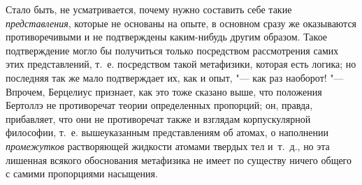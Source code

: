 Стало быть, не усматривается, почему нужно составить себе такие
{\em представления}, которые не основаны на опыте, в основном сразу же
оказываются противоречивыми и не подтверждены каким-нибудь другим образом.
Такое подтверждение могло бы получиться только посредством рассмотрения самих
этих представлений, т.~е. посредством такой метафизики, которая есть логика; но
последняя так же мало подтверждает их, как и опыт, "--- как раз наоборот! "---
Впрочем, Берцелиус признает, как это тоже сказано выше, что положения Бертоллэ
не противоречат теории определенных пропорций; он, правда, прибавляет, что они
не противоречат также и взглядам корпускулярной философии, т.~е. вышеуказанным
представлениям об атомах, о наполнении {\em промежутков} растворяющей жидкости
атомами твердых тел и~т.~д., но эта лишенная всякого обоснования метафизика не
имеет по существу ничего общего с самими пропорциями насыщения.

